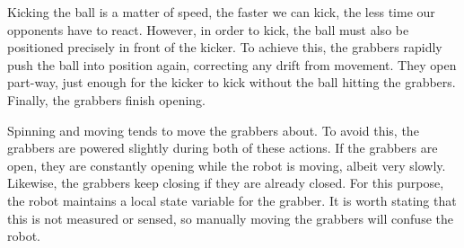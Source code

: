 Kicking the ball is a matter of speed, the faster we can kick, the less time
our opponents have to react. However, in order to kick, the ball must also be
positioned precisely in front of the kicker. To achieve this, the grabbers
rapidly push the ball into position again, correcting any drift from movement.
They open part-way, just enough for the kicker to kick without the ball
hitting the grabbers. Finally, the grabbers finish opening.

Spinning and moving tends to move the grabbers about. To avoid this, the
grabbers are powered slightly during both of these actions. If the grabbers are
open, they are constantly opening while the robot is moving, albeit very
slowly. Likewise, the grabbers keep closing if they are already closed. For
this purpose, the robot maintains a local state variable for the grabber. It is
worth stating that this is not measured or sensed, so manually moving the
grabbers will confuse the robot.
